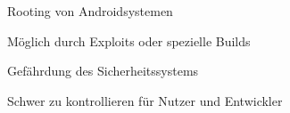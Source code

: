 \begin{frame}
	\centering
	Rooting von Androidsystemen

    		\begin{block}{}
				Möglich durch Exploits oder spezielle Builds
			\end{block}
			\begin{block}{}
				Gefährdung des Sicherheitssystems
			\end{block}
			\begin{block}{}
				Schwer zu kontrollieren für Nutzer und Entwickler
			\end{block}

\end{frame}